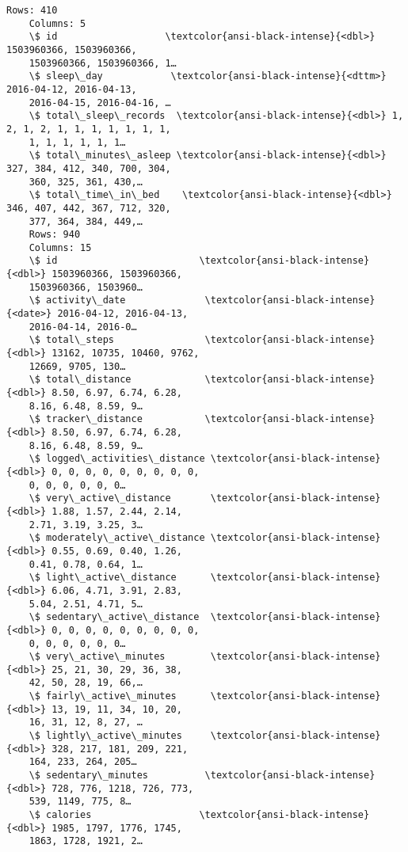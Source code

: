 \begin{Verbatim}[commandchars=\\\{\}]
    Rows: 410
    Columns: 5
    \$ id                   \textcolor{ansi-black-intense}{<dbl>} 1503960366, 1503960366,
    1503960366, 1503960366, 1…
    \$ sleep\_day            \textcolor{ansi-black-intense}{<dttm>} 2016-04-12, 2016-04-13,
    2016-04-15, 2016-04-16, …
    \$ total\_sleep\_records  \textcolor{ansi-black-intense}{<dbl>} 1, 2, 1, 2, 1, 1, 1, 1, 1, 1, 1,
    1, 1, 1, 1, 1, 1…
    \$ total\_minutes\_asleep \textcolor{ansi-black-intense}{<dbl>} 327, 384, 412, 340, 700, 304,
    360, 325, 361, 430,…
    \$ total\_time\_in\_bed    \textcolor{ansi-black-intense}{<dbl>} 346, 407, 442, 367, 712, 320,
    377, 364, 384, 449,…
    Rows: 940
    Columns: 15
    \$ id                         \textcolor{ansi-black-intense}{<dbl>} 1503960366, 1503960366,
    1503960366, 1503960…
    \$ activity\_date              \textcolor{ansi-black-intense}{<date>} 2016-04-12, 2016-04-13,
    2016-04-14, 2016-0…
    \$ total\_steps                \textcolor{ansi-black-intense}{<dbl>} 13162, 10735, 10460, 9762,
    12669, 9705, 130…
    \$ total\_distance             \textcolor{ansi-black-intense}{<dbl>} 8.50, 6.97, 6.74, 6.28,
    8.16, 6.48, 8.59, 9…
    \$ tracker\_distance           \textcolor{ansi-black-intense}{<dbl>} 8.50, 6.97, 6.74, 6.28,
    8.16, 6.48, 8.59, 9…
    \$ logged\_activities\_distance \textcolor{ansi-black-intense}{<dbl>} 0, 0, 0, 0, 0, 0, 0, 0, 0,
    0, 0, 0, 0, 0, 0…
    \$ very\_active\_distance       \textcolor{ansi-black-intense}{<dbl>} 1.88, 1.57, 2.44, 2.14,
    2.71, 3.19, 3.25, 3…
    \$ moderately\_active\_distance \textcolor{ansi-black-intense}{<dbl>} 0.55, 0.69, 0.40, 1.26,
    0.41, 0.78, 0.64, 1…
    \$ light\_active\_distance      \textcolor{ansi-black-intense}{<dbl>} 6.06, 4.71, 3.91, 2.83,
    5.04, 2.51, 4.71, 5…
    \$ sedentary\_active\_distance  \textcolor{ansi-black-intense}{<dbl>} 0, 0, 0, 0, 0, 0, 0, 0, 0,
    0, 0, 0, 0, 0, 0…
    \$ very\_active\_minutes        \textcolor{ansi-black-intense}{<dbl>} 25, 21, 30, 29, 36, 38,
    42, 50, 28, 19, 66,…
    \$ fairly\_active\_minutes      \textcolor{ansi-black-intense}{<dbl>} 13, 19, 11, 34, 10, 20,
    16, 31, 12, 8, 27, …
    \$ lightly\_active\_minutes     \textcolor{ansi-black-intense}{<dbl>} 328, 217, 181, 209, 221,
    164, 233, 264, 205…
    \$ sedentary\_minutes          \textcolor{ansi-black-intense}{<dbl>} 728, 776, 1218, 726, 773,
    539, 1149, 775, 8…
    \$ calories                   \textcolor{ansi-black-intense}{<dbl>} 1985, 1797, 1776, 1745,
    1863, 1728, 1921, 2…
\end{Verbatim}

